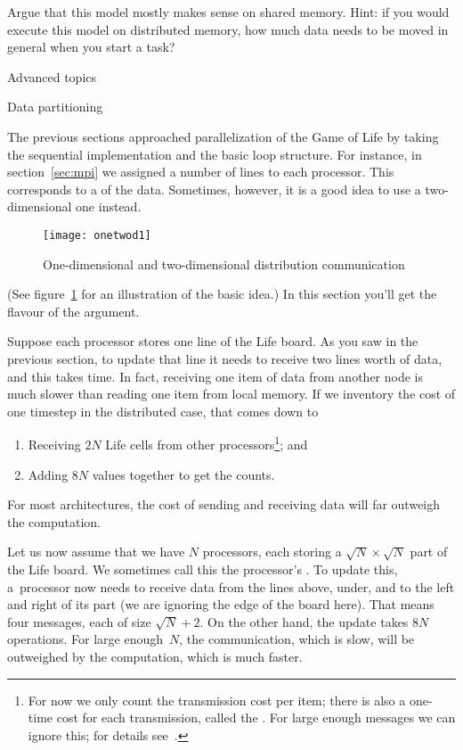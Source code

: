 \begin{exercise}
  Argue that this model mostly makes sense on shared memory. Hint: if
  you would execute this model on distributed memory, how much data
  needs to be moved in general when you start a task?
\end{exercise}

 {Advanced topics}

 {Data partitioning}
\label{sec:distribution}

The previous sections approached parallelization of the
Game of Life by taking the sequential implementation
and the basic loop structure. For instance, in
section~\ref{sec:mpi} we assigned a number of lines to each 
processor. This corresponds to a 
of the data.
Sometimes, however, it is a good idea to use a two-dimensional
one instead.
\begin{figure}[t]
  \texttt{[image: onetwod1]}
  \caption{One-dimensional and two-dimensional distribution communication}
  \label{fig:onetwod1}
\end{figure}
(See figure~\ref{fig:onetwod1} for an illustration 
of the basic idea.) In this section you'll get the
flavour of the argument.

Suppose each processor stores one line of the Life board. 
As you saw in the previous section, to update that line it needs to receive
two lines worth of data, and this takes time.
In fact, receiving one item of data from another node is much slower
than reading one item from local memory. If we inventory the cost 
of one timestep in the distributed case, that comes down to
\begin{enumerate}
\item Receiving $2N$ Life cells from other processors\footnote{For now
  we only count the transmission cost per item; there is also a
  one-time cost for each transmission, called the . For large enough messages we
  can ignore this; for details see~.}; and
\item Adding $8N$ values together to get the counts.
\end{enumerate}
For most architectures, the cost of sending and receiving data will
far outweigh the computation.

Let us now assume that we have $N$ processors, each storing a $\sqrt
N\times\sqrt N$ part of the Life board. We sometimes call this 
the processor's .
To update this, a~processor
now needs to receive data from the lines above, under, and to the left
and right of its part (we are ignoring the edge of the board here).
That means four messages, each of size $\sqrt N+2$.
On the other hand, the update takes $8N$ operations. For large enough~$N$,
the communication, which is slow, will be outweighed by the computation,
which is much faster.

